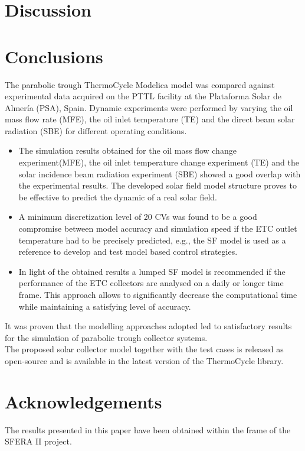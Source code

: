 \documentclass[final,3p,times,review]{elsarticle}
\begin{document}
\section{Discussion}
%


%
\section{Conclusions}
%
The parabolic trough ThermoCycle Modelica model was compared against experimental data acquired on the PTTL facility at the Plataforma Solar de Almer\' ia (PSA), Spain. Dynamic experiments were performed by varying the oil mass flow rate (MFE), the oil inlet temperature (TE) and the direct beam solar radiation (SBE) for different operating conditions. 
%
\begin{itemize}
\item The simulation results obtained for the oil mass flow change experiment(MFE), the oil inlet temperature change experiment (TE) and the solar incidence beam radiation experiment (SBE) showed a good overlap with the experimental results. The developed solar field model structure proves to be effective to predict the dynamic of a real solar field.
%
%
\item A minimum discretization level of 20 CVs was found to be a good compromise between model accuracy and simulation speed if the ETC outlet temperature had to be precisely predicted, e.g., the  SF model is used as a reference to develop and test model based control strategies.
%
\item In light of the obtained results a lumped SF model is recommended if the performance of the ETC collectors are analysed on a daily or longer time frame. This approach allows to significantly decrease the computational time while maintaining a satisfying level of accuracy.
\end{itemize}
%
It was proven that the modelling approaches adopted led to satisfactory results for the simulation of parabolic trough collector systems.\\
The proposed solar collector model together with the test cases is released as open-source and is available in the latest version of the ThermoCycle library.\\
%
%
%
\section{Acknowledgements}
%
The results presented in this paper have been obtained within the frame of the SFERA II project.
%
\clearpage
%
%
\end{document}
